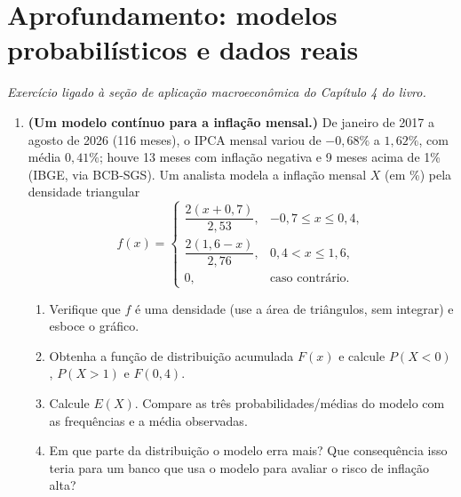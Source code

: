 \documentclass[11pt]{article}
\begin{document}
\bigskip
{}
\section*{Aprofundamento: modelos probabilísticos e dados reais}
\noindent\textit{Exercício ligado à seção de aplicação macroeconômica do Capítulo 4 do livro.}

\begin{enumerate}[label=\textbf{A\arabic*.}, leftmargin=*]
\item \textbf{(Um modelo contínuo para a inflação mensal.)} De janeiro de 2017 a agosto de 2026 (116 meses), o IPCA mensal variou de $-0{,}68\%$ a
$1{,}62\%$, com média $0{,}41\%$; houve 13 meses com inflação negativa e 9 meses acima de 1\% (IBGE, via BCB-SGS). Um analista modela a inflação mensal $X$ (em \%) pela
densidade triangular
$$
f(x) = \begin{cases}
\dfrac{2(x + 0{,}7)}{2{,}53}, & -0{,}7 \leq x \leq 0{,}4, \\[2mm]
\dfrac{2(1{,}6 - x)}{2{,}76}, & 0{,}4 < x \leq 1{,}6, \\[2mm]
0, & \text{caso contrário}.
\end{cases}
$$
\begin{enumerate}[label=(\alph*)]
  \item Verifique que $f$ é uma densidade (use a área de triângulos, sem integrar) e esboce o gráfico.
  \item Obtenha a função de distribuição acumulada $F(x)$ e calcule $P(X < 0)$, $P(X > 1)$ e $F(0{,}4)$.
  \item Calcule $E(X)$. Compare as três probabilidades/médias do modelo com as frequências e a média observadas.
  \item Em que parte da distribuição o modelo erra mais? Que consequência isso teria para um banco que usa o modelo para avaliar o risco de inflação alta?
\end{enumerate}

\end{enumerate}
\end{document}
